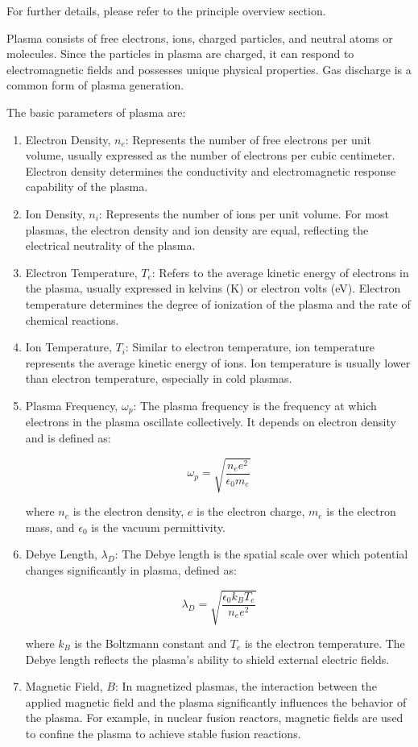For further details, please refer to the principle overview section.

Plasma consists of free electrons, ions, charged particles, and neutral atoms or molecules. Since the particles in plasma are charged, it can respond to electromagnetic fields and possesses unique physical properties. Gas discharge is a common form of plasma generation.

The basic parameters of plasma are:
\begin{enumerate}
\item Electron Density, \( n_e \): Represents the number of free electrons per unit volume, usually expressed as the number of electrons per cubic centimeter. Electron density determines the conductivity and electromagnetic response capability of the plasma.

\item Ion Density, \( n_i \): Represents the number of ions per unit volume. For most plasmas, the electron density and ion density are equal, reflecting the electrical neutrality of the plasma.

\item Electron Temperature, \( T_e \): Refers to the average kinetic energy of electrons in the plasma, usually expressed in kelvins (K) or electron volts (eV). Electron temperature determines the degree of ionization of the plasma and the rate of chemical reactions.

\item Ion Temperature, \( T_i \): Similar to electron temperature, ion temperature represents the average kinetic energy of ions. Ion temperature is usually lower than electron temperature, especially in cold plasmas.

\item Plasma Frequency, \( \omega_p \): The plasma frequency is the frequency at which electrons in the plasma oscillate collectively. It depends on electron density and is defined as:

\[
\omega_p = \sqrt{\frac{n_e e^2}{\epsilon_0 m_e}}
\]

where \( n_e \) is the electron density, \( e \) is the electron charge, \( m_e \) is the electron mass, and \( \epsilon_0 \) is the vacuum permittivity.

\item Debye Length, \( \lambda_D \): The Debye length is the spatial scale over which potential changes significantly in plasma, defined as:

\[
\lambda_D = \sqrt{\frac{\epsilon_0 k_B T_e}{n_e e^2}}
\]

where \( k_B \) is the Boltzmann constant and \( T_e \) is the electron temperature. The Debye length reflects the plasma's ability to shield external electric fields.

\item Magnetic Field, \( B \): In magnetized plasmas, the interaction between the applied magnetic field and the plasma significantly influences the behavior of the plasma. For example, in nuclear fusion reactors, magnetic fields are used to confine the plasma to achieve stable fusion reactions.
\end{enumerate}

